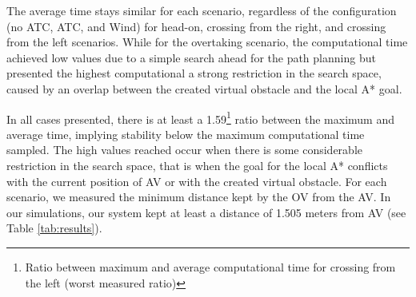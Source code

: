         
        The average time stays similar for each scenario, regardless of the configuration (no \ac{ATC}, \ac{ATC}, and Wind) for head-on, crossing from the right, and crossing from the left scenarios. While for the overtaking scenario, the computational time achieved low values due to a simple search ahead for the path planning but presented the highest computational a strong restriction in the search space, caused by an overlap between the created virtual obstacle and the local A* goal.
        
        In all cases presented, there is at least a 1.59\footnote{Ratio between maximum and average computational time for crossing from the left (worst measured ratio)} ratio between the maximum and average time, implying stability below the maximum computational time sampled. The high values reached occur when there is some considerable restriction in the search space, that is when the goal for the local A* conflicts with the current position of \ac{AV} or with the created virtual obstacle. For each scenario, we measured the minimum distance kept by the \ac{OV} from the \ac{AV}. In our simulations, our system kept at least a distance of 1.505 meters from \ac{AV} (see Table \ref{tab:results}). 
        

